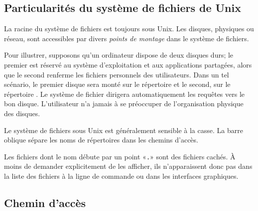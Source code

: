 \subsection{Particularités du système de fichiers de Unix}
\label{sec:informatique:fs:unix}

La racine du système de fichiers est toujours \code{/} sous Unix. Les
disques, physiques ou réseau, sont accessibles par divers \emph{points
  de montage} dans le système de fichiers.

Pour illustrer, supposons qu'un ordinateur dispose de deux disques
durs; le premier est réservé au système d'exploitation et aux
applications partagées, alors que le second renferme les fichiers
personnels des utilisateurs. Dans un tel scénario, le premier disque
sera monté sur le répertoire \code{/} et le second, sur le répertoire
. Le système de fichier dirigera automatiquement les
requêtes vers le bon disque. L'utilisateur n'a jamais à se préoccuper
de l'organisation physique des disques.


Le système de fichiers sous Unix est généralement sensible à la casse.
La barre oblique \code{/} sépare les noms de répertoires dans les
chemins d'accès.

Les fichiers dont le nom débute par un point «\verb=.=» sont des
fichiers cachés. À moins de demander explicitement de les afficher,
ils n'apparaissent donc pas dans la liste des fichiers à la ligne de
commande ou dans les interfaces graphiques.

\subsection{Chemin d'accès}
\label{sec:informatique:fs:path}

